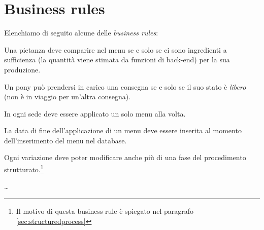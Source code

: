 \section{Business rules} \label{sec:businessrules}
Elenchiamo di seguito alcune delle {\it business rules}:
\begin{enumbusinessrules}
\item Una pietanza deve comparire nel menu se e solo se ci sono ingredienti a sufficienza (la quantità viene stimata da funzioni di back-end) per la sua produzione.
\item Un pony può prendersi in carico una consegna se e solo se il suo stato è {\it libero} (non è in viaggio per un'altra consegna).
\item In ogni sede deve essere applicato un solo menu alla volta.
\item\label{br.menuenddate} La data di fine dell'applicazione di un menu deve essere inserita al momento dell'inserimento del menu nel database.
\item\label{br.variations} Ogni variazione deve poter modificare anche più di una fase del procedimento strutturato.\footnote{Il motivo di questa business rule è spiegato nel paragrafo \vref{sec:structuredprocess}}
\item \ldots
\end{enumbusinessrules}

